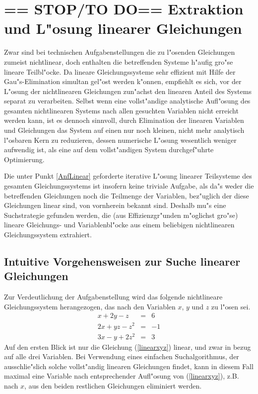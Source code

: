 
\section{== STOP/TO DO== Extraktion und L"osung linearer Gleichungen}

Zwar sind bei technischen Aufgabenstellungen die zu l"osenden Gleichungen
zumeist nichtlinear, doch enthalten die betreffenden Systeme h"aufig gro"se
lineare Teilbl"ocke. Da lineare Gleichungssysteme sehr effizient mit Hilfe
der Gau"s-Elimination simultan gel"ost werden k"onnen, empfiehlt es sich, vor
der L"osung der nichtlinearen Gleichungen zun"achst den linearen Anteil des
Systems separat zu verarbeiten. Selbst wenn eine vollst"andige analytische
Aufl"osung des gesamten nichtlinearen Systems nach allen gesuchten Variablen
nicht  erreicht werden kann, ist es dennoch sinnvoll, durch Elimination der
linearen Variablen und Gleichungen das System auf einen nur noch kleinen,
nicht mehr analytisch l"osbaren Kern zu reduzieren, dessen numerische L"osung
wesentlich weniger aufwendig ist, als eine auf dem vollst"andigen System
durchgef"uhrte Optimierung.

Die unter Punkt \ref{AnfLinear} geforderte iterative L"osung linearer 
Teilsysteme des gesamten Gleichungssystems ist insofern keine triviale
Aufgabe, als da"s weder die betreffenden Gleichungen noch die Teilmenge
der Variablen, bez"uglich der diese Gleichungen linear sind, von
vornherein bekannt sind. Deshalb mu"s eine Suchstrategie gefunden 
werden, die (aus Effizienzgr"unden m"oglichst gro"se) lineare
Gleichungs- und Variablenbl"ocke aus einem beliebigen nichtlinearen
Gleichungssystem extrahiert.

\subsection{\label{intuitive}Intuitive Vorgehensweisen zur Suche
linearer Gleichungen}

Zur Verdeutlichung der Aufgabenstellung wird das folgende nichtlineare
Gleichungssystem herangezogen, das nach den Variablen $x$, $y$ und $z$ 
zu l"osen sei.
\begin{eqnarray}
 x + 2y -    z &=&  6 \label{linearxyz} \\
2x + yz -  z^2 &=& -1 \label{linearx}   \\
3x -  y + 2z^2 &=&  3 \label{linearxy}
\end{eqnarray}
Auf den ersten Blick ist nur die Gleichung (\ref{linearxyz}) linear, und
zwar in bezug auf alle drei Variablen. Bei Verwendung eines einfachen 
Suchalgorithmus, der ausschlie"slich solche vollst"andig linearen
Gleichungen findet, kann in diesem Fall maximal eine Variable nach
entsprechender Aufl"osung von (\ref{linearxyz}), z.B. nach $x$, aus den
beiden restlichen Gleichungen eliminiert werden.


